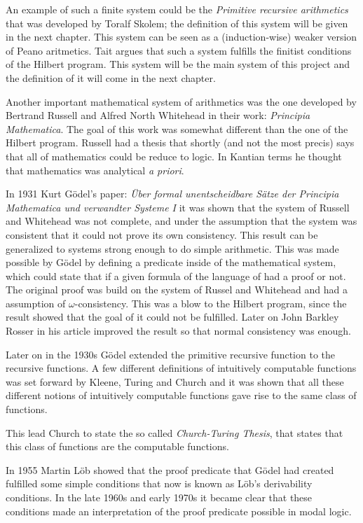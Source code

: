 \documentclass[../main.tex]{subfiles}
\begin{document}
An example of such a finite system could be the \textit{Primitive recursive
arithmetics} that was developed by Toralf Skolem; the definition of this system
will be given in the next chapter. This system can be seen as a
(induction-wise) weaker version of Peano aritmetics. Tait  argues
that such a system fulfills the finitist conditions of the Hilbert program.
This system will be the main system of this project and the definition of it
will come in the next chapter.

Another  important mathematical system of arithmetics was
the one developed by Bertrand Russell and Alfred North Whitehead in their work:
\textit{Principia Mathematica}. The goal of this work was somewhat different
than the one of the Hilbert program. Russell had a thesis that shortly (and not
the most precis) says that all of mathematics could be reduce to logic. In
Kantian terms he thought that mathematics was analytical \textit{a priori}. 

In 1931 Kurt Gödel's paper: \textit{Über formal unentscheidbare Sätze der
Principia Mathematica und verwandter Systeme I} it was shown  that the system of
Russell and Whitehead was not complete, and under the assumption that the
system was consistent that it could not prove its own consistency.
This result can be generalized to systems strong enough to do simple
arithmetic. This was made possible by Gödel by defining a predicate inside of
the mathematical system, which could state that if a given formula of the
language of had a proof or not.
The
original proof was build on the system of Russel and Whitehead and had a
assumption of $\omega$-consistency. This
was a blow to the Hilbert program, since the result showed that the goal of it
could not be fulfilled. Later on John Barkley Rosser in his article
\parencite{Ross1936} improved the
result so that normal  consistency was enough.



Later on in the 1930s Gödel extended the primitive recursive function to the  recursive
functions. A few different definitions of intuitively computable functions was
set forward by Kleene, Turing and Church and it was shown that all these
different notions of intuitively computable functions gave rise to the same
class of functions.

This lead Church to state the so called \textit{Church-Turing Thesis}, that
states that this class of functions are the computable functions.

In 1955 Martin Löb showed that the proof predicate that Gödel had created
fulfilled some simple conditions that now is known as Löb's derivability
conditions. In the late 1960s and early 1970s it became clear that these
conditions made an interpretation of the proof predicate possible in modal
logic.
\end{document}
